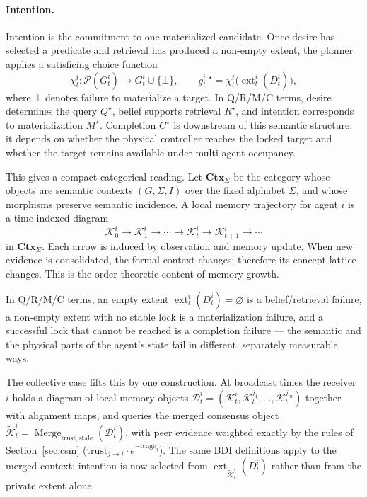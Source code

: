 \documentclass{article}
\begin{document}
\paragraph{Intention.} Intention is the commitment to one materialized
candidate. Once desire has selected a predicate and retrieval has
produced a non-empty extent, the planner applies a satisficing choice
function
\[
\chi_t^i:\mathcal{P}(G_t^i)\rightarrow G_t^i\cup\{\bot\},
\qquad
g_t^{i,\star}=\chi_t^i\!\big(\operatorname{ext}_t^i(D_t^i)\big),
\]
where $\bot$ denotes failure to materialize a target. In Q/R/M/C terms,
desire determines the query $Q^\star$, belief supports retrieval
$R^\star$, and intention corresponds to materialization $M^\star$.
Completion $C^\star$ is downstream of this semantic structure: it
depends on whether the physical controller reaches the locked target
and whether the target remains available under multi-agent occupancy.

This gives a compact categorical reading. Let $\mathbf{Ctx}_\Sigma$ be
the category whose objects are semantic contexts $(G,\Sigma,I)$ over the
fixed alphabet $\Sigma$, and whose morphisms preserve semantic
incidence. A local memory trajectory for agent $i$ is a time-indexed
diagram
\[
\mathcal{K}_0^i\rightarrow\mathcal{K}_1^i\rightarrow\cdots
\rightarrow\mathcal{K}_t^i\rightarrow\mathcal{K}_{t+1}^i\rightarrow\cdots
\]
in $\mathbf{Ctx}_\Sigma$. Each arrow is induced by observation and
memory update. When new evidence is consolidated, the formal context
changes; therefore its concept lattice changes. This is the
order-theoretic content of memory growth.

In Q/R/M/C terms, an empty extent
$\operatorname{ext}_t^i(D_t^i)=\varnothing$ is a belief/retrieval
failure, a non-empty extent with no stable lock is a materialization
failure, and a successful lock that cannot be reached is a completion
failure --- the semantic and the physical parts of the agent's state
fail in different, separately measurable ways.

The collective case lifts this by one construction. At broadcast times
the receiver $i$ holds a diagram of local memory objects
$\mathcal{D}_t^i=(\mathcal{K}_t^i,\mathcal{K}_t^{j_1},\ldots,
\mathcal{K}_t^{j_m})$ together with alignment maps, and queries the
merged consensus object
$\widetilde{\mathcal{K}}_t^i=\operatorname{Merge}_{\mathrm{trust},
\mathrm{stale}}(\mathcal{D}_t^i)$, with peer evidence weighted exactly
by the rules of Section~\ref{sec:csm}
($\mathrm{trust}_{j\to i}\cdot e^{-\alpha\,\mathrm{age}_j}$). The same
BDI definitions apply to the merged context: intention is now selected
from $\operatorname{ext}_{\widetilde{\mathcal{K}}_t^i}(D_t^i)$ rather
than from the private extent alone.
\end{document}
